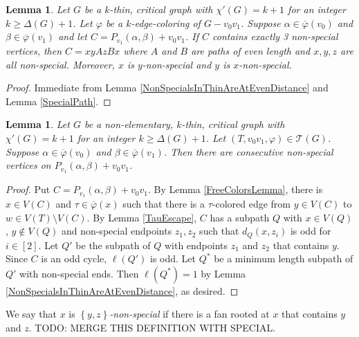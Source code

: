 \documentclass[12pt]{amsart}
\theoremstyle{plain}
\newtheorem{lem}[thm]{Lemma}
\theoremstyle{definition}
\theoremstyle{remark}
\newcommand{\fancy}[1]{\mathcal{#1}}
\newcommand{\T}{\fancy{T}}
\newcommand{\set}[1]{\left\{ #1 \right\}}
\newcommand{\irange}[1]{\left[#1\right]}
\newcommand{\vph}{\varphi}
\newcommand{\vphn}{\overline{\varphi}}
\begin{document}
\begin{lem}\label{ThreeNonSpecialOnCycle}
Let $G$ be a $k$-thin, critical graph with $\chi'(G) = k+1$ for an integer $k \ge \Delta(G) + 1$.
Let $\vph$ be a $k$-edge-coloring of $G-v_0v_1$. Suppose $\alpha \in \vphn(v_0)$ and $\beta \in \vphn(v_1)$ and let $C = P_{v_1}(\alpha, \beta) + v_0v_1$.  If $C$ contains exactly 3 non-special vertices,
then $C = xyAzBx$ where $A$ and $B$ are paths of even length and $x,y,z$ are all non-special.  Moreover, $x$ is $y$-non-special and $y$ is $x$-non-special.
\end{lem}
\begin{proof}
Immediate from Lemma \ref{NonSpecialsInThinAreAtEvenDistance} and Lemma \ref{SpecialPath}.
\end{proof}

\begin{lem}\label{ConsecutiveNonSpecials}
Let $G$ be a non-elementary, $k$-thin, critical graph with $\chi'(G) = k+1$ for an integer $k \ge \Delta(G) + 1$.
Let $(T, v_0v_1, \vph) \in \T(G)$. Suppose $\alpha \in \vphn(v_0)$ and $\beta \in \vphn(v_1)$.  Then there are consecutive non-special vertices on $P_{v_1}(\alpha, \beta) + v_0v_1$.
\end{lem}
\begin{proof}
Put $C = P_{v_1}(\alpha, \beta) + v_0v_1$.  By Lemma \ref{FreeColorsLemma}, there is $x \in V(C)$ and $\tau \in \vphn(x)$ such that there is a $\tau$-colored edge from $y \in V(C)$ to $w \in V(T) \setminus V(C)$.
By Lemma \ref{TauEscape}, $C$ has a subpath $Q$ with $x \in V(Q)$, $y \not \in V(Q)$ and non-special endpoints $z_1,z_2$ such that $d_Q(x, z_i)$ is odd for $i \in \irange{2}$.  
Let $Q'$ be the subpath of $Q$ with endpoints $z_1$ and $z_2$ that contains $y$. Since $C$ is an odd cycle, $\ell(Q')$ is odd.  Let $Q^*$ be a minimum length subpath of $Q'$ with non-special ends.  
Then $\ell(Q^*) = 1$ by Lemma \ref{NonSpecialsInThinAreAtEvenDistance}, as desired.
\end{proof}

We say that $x$ is \emph{$\set{y,z}$-non-special} if there is a fan rooted at $x$ that contains $y$ and $z$.  TODO: MERGE THIS DEFINITION WITH SPECIAL.
\end{document}
